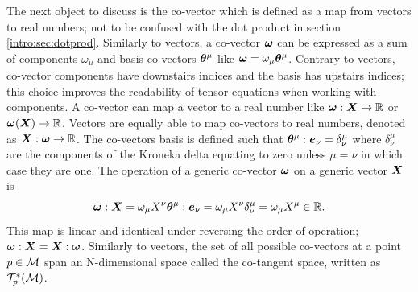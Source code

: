 The next object to discuss is the co-vector which is defined as a map from vectors to real numbers; not to be confused with the dot product in section \ref{intro:sec:dotprod}. Similarly to vectors, a co-vector $\boldsymbol{\omega}$ can be expressed as a sum of components $\omega_\mu$ and basis co-vectors $\boldsymbol{\theta}^\mu$ like $\boldsymbol{\omega} = \omega_\mu \boldsymbol{\theta}^\mu$. Contrary to vectors, co-vector components have downstairs indices and the basis has upstairs indices; this choice improves the readability of tensor equations when working with components. A co-vector can map a vector to a real number like $\boldsymbol{\omega}:\boldsymbol{X} \rightarrow \mathbb{R}$ or $\boldsymbol{\omega}(\boldsymbol{X}) \rightarrow \mathbb{R}$. Vectors are equally able to map co-vectors to real numbers, denoted as $\boldsymbol{X}:\boldsymbol{\omega}\rightarrow\mathbb{R}$. The co-vectors basis is defined such that $\boldsymbol{\theta}^\mu : \boldsymbol{e}_\nu = \delta^\mu_\nu$ where $\delta^\mu_\nu$ are the components of the Kroneka delta equating to zero unless $\mu=\nu$ in which case they are one. The operation of a generic co-vector $\boldsymbol{\omega}$ on a generic vector $\boldsymbol{X}$ is
\begin{equation}
\boldsymbol{\omega}: \boldsymbol{X} = \omega_\mu X^\nu \boldsymbol{\theta}^\mu:\boldsymbol{e}_\nu = \omega_\mu X^\nu \delta^\mu_\nu = \omega_\mu X^\mu \in \mathbb{R}.
\end{equation}
This map is linear and identical under reversing the order of operation; $\boldsymbol{\omega} : \boldsymbol{X} = \boldsymbol{X} : \boldsymbol{\omega}$. Similarly to vectors, the set of all possible co-vectors at a point $p\in\mathcal{M}$ span an N-dimensional space called the co-tangent space, written as $\mathcal{T}^*_p(\mathcal{M})$.

